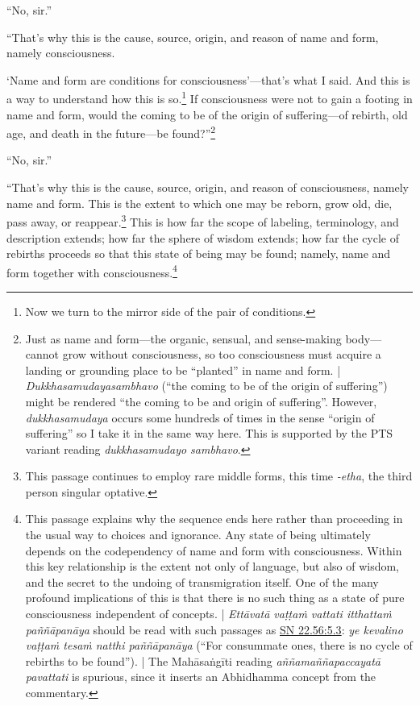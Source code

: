 \documentclass[12pt,openany]{book}%
\begin{document}
“No, sir.” 

“That’s why this is the cause, source, origin, and reason of name and form, namely consciousness. 

‘Name and form are conditions for consciousness’—that’s what I said. And this is a way to understand how this is so.\footnote{Now we turn to the mirror side of the pair of conditions. } If consciousness were not to gain a footing in name and form, would the coming to be of the origin of suffering—of rebirth, old age, and death in the future—be found?”\footnote{Just as name and form—the organic, sensual, and sense-making body—cannot grow without consciousness, so too consciousness must acquire a landing or grounding place to be “planted” in name and form. | \textit{Dukkhasamudayasambhavo} (“the coming to be of the origin of suffering”) might be rendered “the coming to be and origin of suffering”. However, \textit{dukkhasamudaya} occurs some hundreds of times in the sense “origin of suffering” so I take it in the same way here. This is supported by the PTS variant reading \textit{dukkhasamudayo sambhavo}. } 

“No, sir.” 

“That’s why this is the cause, source, origin, and reason of consciousness, namely name and form. This is the extent to which one may be reborn, grow old, die, pass away, or reappear.\footnote{This passage continues to employ rare middle forms, this time \textit{-etha}, the third person singular optative. } This is how far the scope of labeling, terminology, and description extends; how far the sphere of wisdom extends; how far the cycle of rebirths proceeds so that this state of being may be found; namely, name and form together with consciousness.\footnote{This passage explains why the sequence ends here rather than proceeding in the usual way to choices and ignorance. Any state of being ultimately depends on the codependency of name and form with consciousness. Within this key relationship is the extent not only of language, but also of wisdom, and the secret to the undoing of transmigration itself. One of the many profound implications of this is that there is no such thing as a state of pure consciousness independent of concepts. | \textit{\textsanskrit{Ettāvatā} \textsanskrit{vaṭṭaṁ} vattati \textsanskrit{itthattaṁ} \textsanskrit{paññāpanāya}} should be read with such passages as \href{https://suttacentral.net/sn22.56/en/sujato\#5.3}{SN 22.56:5.3}: \textit{ye kevalino \textsanskrit{vaṭṭaṁ} \textsanskrit{tesaṁ} natthi \textsanskrit{paññāpanāya}} (“For consummate ones, there is no cycle of rebirths to be found”). | The \textsanskrit{Mahāsaṅgīti} reading \textit{\textsanskrit{aññamaññapaccayatā} pavattati} is spurious, since it inserts an Abhidhamma concept from the commentary. } 
\end{document}
